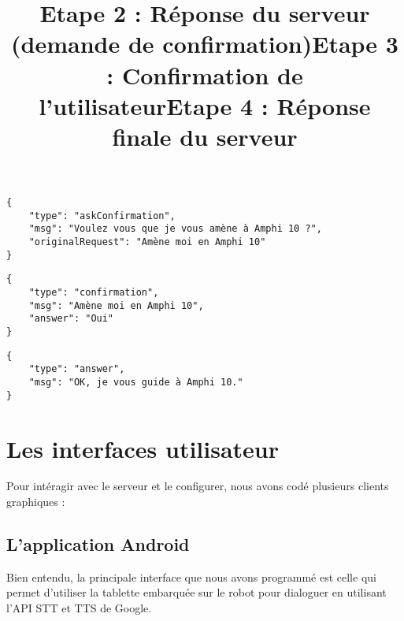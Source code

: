 \documentclass[a4paper,10pt]{report}
\begin{document}
          \begin{listing}[h]
            \begin{verbatim}
{
    "type": "askConfirmation",
    "msg": "Voulez vous que je vous amène à Amphi 10 ?",
    "originalRequest": "Amène moi en Amphi 10"
}
            \end{verbatim}
            \title{Etape 2 : Réponse du serveur (demande de confirmation)}
          \end{listing}

          \begin{listing}[h]
            \begin{verbatim}
{
    "type": "confirmation",
    "msg": "Amène moi en Amphi 10",
    "answer": "Oui"
}
            \end{verbatim}
            \title{Etape 3 : Confirmation de l'utilisateur}
          \end{listing}

          \begin{listing}[h]
            \begin{verbatim}
{
    "type": "answer",
    "msg": "OK, je vous guide à Amphi 10."
}
            \end{verbatim}
            \title{Etape 4 : Réponse finale du serveur}
          \end{listing}

      \section{Les interfaces utilisateur}

        {Pour intéragir avec le serveur et le configurer, nous avons codé plusieurs clients graphiques :}
        \subsection{L'application Android}
          {Bien entendu, la principale interface que nous avons programmé est celle qui permet d'utiliser la tablette embarquée sur le robot pour dialoguer en utilisant l'API STT et TTS de Google.}
\end{document}
